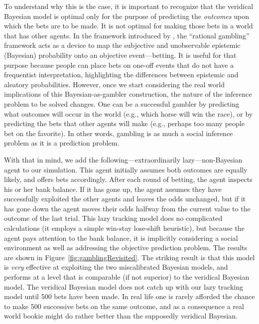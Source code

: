 \documentclass[doc,floatsintext]{apa6}
\begin{document}
To understand why this is the case, it is important to recognize that the veridical Bayesian model is optimal only for the purpose of predicting the {\it outcomes} upon which the bets are to be made. It is not optimal for making those bets in a world that has other agents. In the framework introduced by , the ``rational gambling'' framework acts as a device to map the subjective and unobservable epistemic (Bayesian) probability onto an objective event---betting. It is useful for that purpose because people can place bets on one-off events that do not have a frequentist interpretation, highlighting the differences between epistemic and aleatory probabilities. However, once we start considering the real world implications of this Bayesian-as-gambler construction, the nature of the inference problem to be solved changes. One can be a successful gambler by predicting what outcomes will occur in the world (e.g., which horse will win the race), or by predicting the bets that other agents will make (e.g., perhaps too many people bet on the favorite). In other words, gambling is as much a social inference problem as it is a prediction problem.

With that in mind, we add the following---extraordinarily lazy---non-Bayesian agent to our simulation. This agent initially assumes both outcomes are equally likely, and offers bets accordingly. After each round of betting, the agent inspects his or her bank balance. If it has gone up, the agent assumes they have successfully exploited the other agents and leaves the odds unchanged, but if it has gone down the agent moves their odds halfway from the current value to the outcome of the last trial. This lazy tracking model does no complicated calculations (it employs a simple win-stay lose-shift heuristic), but because the agent pays attention to the bank balance, it is implicitly considering a social environment as well as addressing the objective prediction problem. The results are shown in Figure~\ref{fig:gamblingRevisited}. The striking result is that this model is {\it very} effective at exploiting the two miscalibrated Bayesian models, and performs at a level that is comparable (if not superior) to the veridical Bayesian model. The veridical Bayesian model does not catch up with our lazy tracking model until 500 bets have been made. In real life one is rarely afforded the chance to make 500 successive bets on the same outcome, and as a consequence a real world bookie might do rather better than the supposedly veridical Bayesian.
\end{document}
